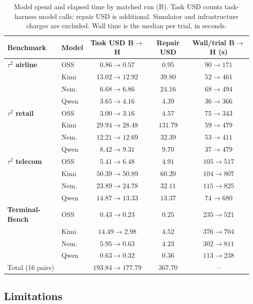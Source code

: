 \documentclass[11pt,letterpaper]{article}
\begin{document}
\begin{table}[H]
\ContinuedFloat
\centering\scriptsize
\setlength{\tabcolsep}{3pt}
\caption{Model spend and elapsed time by matched run (B).
Task USD counts task-harness model calls; repair USD is additional.
Simulator and infrastructure charges are excluded. Wall time is the
median per trial, in seconds.}
\label{tab:cost-b}
\begin{tabular*}{\linewidth}{@{\extracolsep{\fill}}llccc@{}}
\toprule
Benchmark & Model & Task USD B$\to$H & Repair USD & Wall/trial B$\to$H (s) \\
\midrule
\textbf{$\tau^2$ airline} & OSS & $0.86\to0.57$ & $0.95$ & $90\to171$ \\
 & Kimi & $13.02\to12.92$ & $39.80$ & $52\to461$ \\
 & Nem. & $6.68\to6.86$ & $24.16$ & $68\to494$ \\
 & Qwen & $3.65\to4.16$ & $4.39$ & $36\to366$ \\
\midrule
\textbf{$\tau^2$ retail} & OSS & $3.00\to3.16$ & $4.57$ & $75\to343$ \\
 & Kimi & $29.94\to28.48$ & $131.79$ & $59\to479$ \\
 & Nem. & $12.21\to12.69$ & $32.39$ & $53\to411$ \\
 & Qwen & $8.42\to9.31$ & $9.70$ & $37\to479$ \\
\midrule
\textbf{$\tau^2$ telecom} & OSS & $5.41\to6.48$ & $4.91$ & $105\to517$ \\
 & Kimi & $50.39\to50.89$ & $60.20$ & $104\to807$ \\
 & Nem. & $23.89\to24.78$ & $32.11$ & $115\to825$ \\
 & Qwen & $14.87\to13.33$ & $13.37$ & $74\to680$ \\
\midrule
\textbf{Terminal-Bench} & OSS & $0.43\to0.23$ & $0.25$ & $235\to521$ \\
 & Kimi & $14.49\to2.98$ & $4.52$ & $376\to704$ \\
 & Nem. & $5.95\to0.63$ & $4.23$ & $302\to811$ \\
 & Qwen & $0.63\to0.32$ & $0.36$ & $113\to238$ \\
\midrule
Total (16 pairs) & & $193.84\to177.79$ & $367.70$ & -- \\
\bottomrule
\end{tabular*}
\end{table}


\subsection{Limitations}
\label{sec:limitations}
\end{document}
